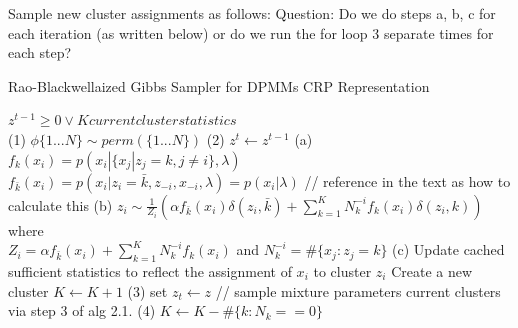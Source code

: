 \documentclass{article}
\begin{document}
Sample new cluster assignments as follows:
Question: Do we do steps a, b, c for each iteration (as written below) or do we run the for loop 3 separate times for each step?
\begin{algorithm}
\caption{Rao-Blackwellaized Gibbs Sampler for DPMMs CRP Representation \cite{Sudderth:aa}}
\begin{algorithmic} 
\REQUIRE $z^{t-1} \geq 0 \vee K current cluster statistics$ \\
\STATE (1) $\phi\{1...N\} \sim perm(\{1...N\})$
\STATE (2) $z^{t} \leftarrow z^{t-1} $
\STATE (a)
\STATE $f_{k}(x_i) = p(x_i | \{x_j | z_j = k, j \neq i\}, \lambda)$ 
\ENDFOR
\STATE $f_{\bar{k}}(x_i) = p(x_i | z_i = \bar{k}, z_{-i}, x_{-i}, \lambda) = p(x_i | \lambda)$ // reference in the text as how to calculate this
\STATE (b) $z_i \sim \frac{1}{Z_i} (  \alpha f_{\bar{k}}(x_i) \delta(z_i, \bar{k}) + \sum_{k=1}^K N_k^{-i}  f_k(x_i) \delta(z_i, k) ) $ where \\
$ Z_i = \alpha f_{\bar{k}}(x_i) + \sum_{k=1}^K N_k^{-i} f_k(x_i)  $ and $ N_k^{-i} = \# \{x_j : z_j = k\} $
\STATE (c) Update cached sufficient statistics to reflect the assignment of $x_i$ to cluster $z_i$
\STATE Create a new cluster
\STATE $K \leftarrow K + 1$
\ENDIF 
\ENDFOR 
\STATE (3) set $ z_t \leftarrow z$ // sample mixture parameters current clusters via step 3 of alg 2.1. \cite{Sudderth:aa}
\STATE (4) $K \leftarrow K - \#\{ k : N_k == 0 \} $
\end{algorithmic}
\end{algorithm}
\end{document}
